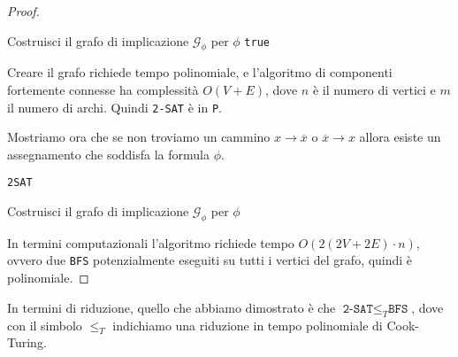 \begin{proof}
\begin{algorithm}[H]
        Costruisci il grafo di implicazione $\mathcal{G}_\phi$ per $\phi$ \;
        \Return \texttt{true} 
    \end{algorithm}
    
    Creare il grafo richiede tempo polinomiale, e l'algoritmo di componenti fortemente connesse
    ha complessità $O(V + E)$, dove $n$ è il numero di vertici e $m$ il numero di archi.
    Quindi \texttt{2-SAT} è in \texttt{P}.

    Mostriamo ora che se non troviamo un cammino $x \rightarrow \overline{x}$ o $\overline{x} \rightarrow x$
    allora esiste un assegnamento che soddisfa la formula $\phi$.

    \begin{algorithm}[H]
        \caption{\texttt{2SAT}}
        \DontPrintSemicolon  


        \BlankLine
        Costruisci il grafo di implicazione $\mathcal{G}_\phi$ per $\phi$ \;
    \end{algorithm}
    In termini computazionali l'algoritmo richiede tempo $O(2(2V + 2E)\cdot n)$, ovvero due 
    \texttt{BFS} potenzialmente eseguiti su tutti i vertici del grafo, quindi è polinomiale.
\end{proof}

In termini di riduzione, quello che abbiamo dimostrato è che $\texttt{2-SAT} \leq_T \texttt{BFS}$,
dove con il simbolo $\leq_T$ indichiamo una riduzione in tempo polinomiale di Cook-Turing.


